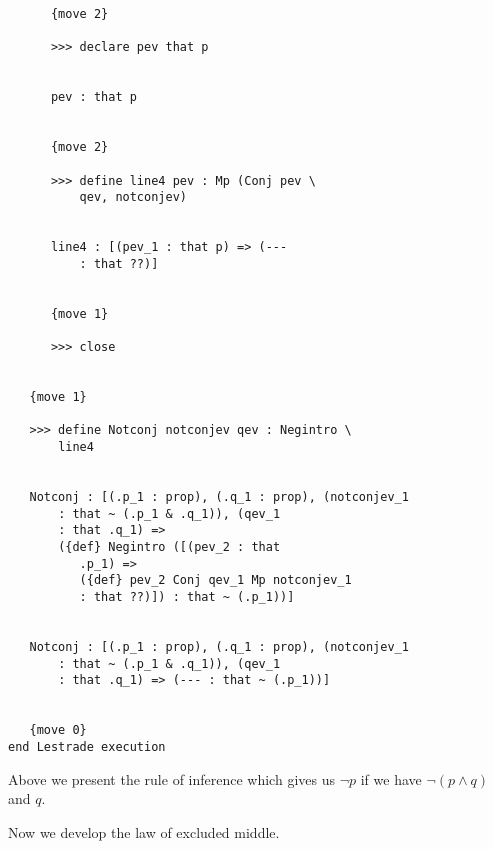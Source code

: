 \documentclass[12pt]{article}
\begin{document}
\begin{verbatim}
      {move 2}

      >>> declare pev that p


      pev : that p


      {move 2}

      >>> define line4 pev : Mp (Conj pev \
          qev, notconjev)


      line4 : [(pev_1 : that p) => (--- 
          : that ??)]


      {move 1}

      >>> close


   {move 1}

   >>> define Notconj notconjev qev : Negintro \
       line4


   Notconj : [(.p_1 : prop), (.q_1 : prop), (notconjev_1 
       : that ~ (.p_1 & .q_1)), (qev_1 
       : that .q_1) => 
       ({def} Negintro ([(pev_2 : that 
          .p_1) => 
          ({def} pev_2 Conj qev_1 Mp notconjev_1 
          : that ??)]) : that ~ (.p_1))]


   Notconj : [(.p_1 : prop), (.q_1 : prop), (notconjev_1 
       : that ~ (.p_1 & .q_1)), (qev_1 
       : that .q_1) => (--- : that ~ (.p_1))]


   {move 0}
end Lestrade execution
\end{verbatim}

Above we present the rule of inference which gives us $\neg p$ if we have $\neg(p \wedge q)$ and $q$.

Now we develop the law of excluded middle.
\end{document}
